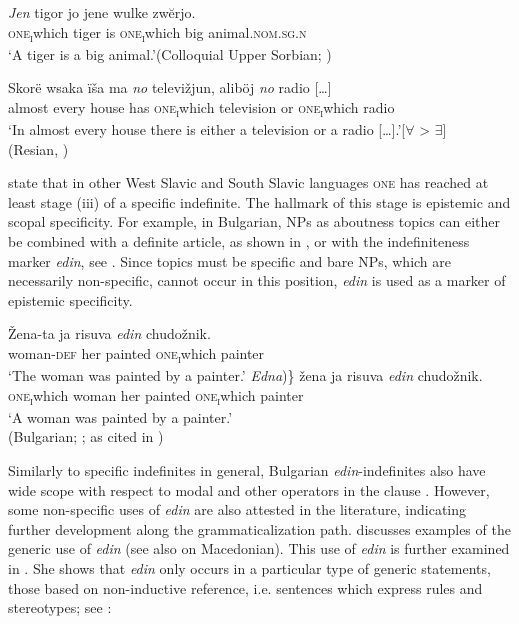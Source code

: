 \documentclass[output=paper,colorlinks,citecolor=brown]{langscibook}
\begin{document}
\ea\label{geist:ex:sorbian}
\gll \textit{Jen} tigor jo jene wulke zwĕrjo.\\
\textsc{one\textsubscript{i}}which tiger is \textsc{one\textsubscript{i}}which big animal.\textsc{nom.sg.n}\\
\glt ‘A tiger is a big animal.’\hfill (Colloquial Upper Sorbian; \citealt{Wiemer2020})
\z

\ea\label{geist:ex:resian}
\gll Skorë wsaka ïša ma \textit{no} televižjun, aliböj \textit{no} {radio [\dots]}\\
almost every house has \textsc{one\textsubscript{i}}which television or \textsc{one\textsubscript{i}}which radio\\
\glt ‘In almost every house there is either a television or a radio [\dots].’\hfill [$\forall$ > $\exists$]\smallskip\\\hfill (Resian, \citealt[297]{Runic2019})
\z

\noindent \citet{Belaj.Matovac2015} state that in other West Slavic and South Slavic languages \textsc{one} has reached at least stage (iii) of a specific indefinite. The hallmark of this stage is epistemic and scopal specificity. For example, in Bulgarian, NPs as aboutness topics can either be combined with a definite article, as shown in , or with the indefiniteness marker \textit{edin}, see . Since topics must be specific and bare NPs, which are necessarily non-specific, cannot occur in this position, \textit{edin} is used as a marker of epistemic specificity.

\ea\label{geist:ex:indef-art}
\ea\label{geist:ex:indef-art-a}
\gll Žena-ta ja risuva \textit{edin} chudožnik.\\
woman-\textsc{def} her painted \textsc{one\textsubscript{i}}which painter\\
\glt ‘The woman was painted by a painter.’
\ex\label{geist:ex:indef-art-b}
\gll \minsp{\{*(} \textit{Edna})\} žena ja risuva \textit{edin} chudožnik.\\
{} \textsc{one\textsubscript{i}}which woman her painted \textsc{one\textsubscript{i}}which painter\\
\glt ‘A woman was painted by a painter.’
\\\hfill (Bulgarian; \citealt[515]{Ivancev1957}; as cited in \citealt{Geist2013})
\z\z

\noindent Similarly to specific indefinites in general, Bulgarian \textit{edin}-indefinites also have wide scope with respect to modal and other operators in the clause \citep{Geist2013,Gorishneva2013}. However, some non-specific uses of \textit{edin} are also attested in the literature, indicating further development along the grammaticalization path. \citet{Geist2013} discusses examples of the generic use of \textit{edin} (see also \citealt{Weiss2004} on Macedonian). This use of \textit{edin} is further examined in \citet{Gorishneva2011}. She shows that \textit{edin} only occurs in a particular type of generic statements, those based on non-inductive reference, i.e. sentences which express rules and stereotypes; see :
\end{document}
